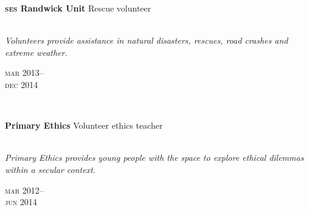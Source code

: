 \begin{minipage}[t]{\mainboxwidth\textwidth}
\textbf{\textsc{ses} Randwick Unit}\phantom{..} Rescue volunteer\\
\\
{\small
\textit{Volunteers provide assistance in natural disasters, rescues, road crashes and extreme weather.}
\par}
\end{minipage}
\begin{minipage}[t]{\detailboxwidth\textwidth}
{
\hfill \textsc{mar} 2013--\\ 
\hspace*{0pt} \hfill \textsc{dec} 2014
\par
}
\end{minipage}
\\

\begin{minipage}[t]{\mainboxwidth\textwidth}
\textbf{Primary Ethics}\phantom{..} Volunteer ethics teacher\\
\\
{\small
\textit{Primary Ethics provides young people with the space to explore ethical dilemmas within a secular context.}
\par}
\end{minipage}
\begin{minipage}[t]{\detailboxwidth\textwidth}
{
\hfill \textsc{mar} 2012--\\ 
\hspace*{0pt} \hfill \textsc{jun} 2014
\par
}
\end{minipage}


